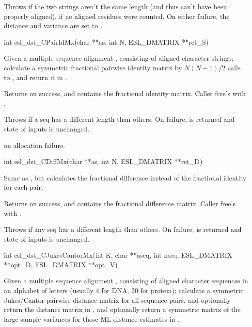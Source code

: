 \begin{sreapi}
Throws  if the two strings aren't the same length (and
thus can't have been properly aligned).
 if no aligned residues were counted.
On either failure, the distance and variance are set
to .


\hypertarget{func:esl_dst_CPairIdMx()}
{\item[int esl\_dst\_CPairIdMx(char **as, int N, ESL\_DMATRIX **ret\_S)]}

Given a multiple sequence alignment , consisting
of  aligned character strings; calculate
a symmetric fractional pairwise identity matrix by $N(N-1)/2$
calls to , and return it in 
.

Returns  on success, and  contains the fractional
identity matrix. Caller free's  with
.

Throws  if a seq has a different
length than others. On failure,  is returned 
and state of inputs is unchanged.

 on allocation failure.


\hypertarget{func:esl_dst_CDiffMx()}
{\item[int esl\_dst\_CDiffMx(char **as, int N, ESL\_DMATRIX **ret\_D)]}

Same as , but calculates
the fractional difference  instead of the
fractional identity  for each pair.

Returns  on success, and  contains the
fractional difference matrix. Caller free's  with 
.

Throws  if any seq has a different
length than others. On failure,  is returned 
and state of inputs is unchanged.


\hypertarget{func:esl_dst_CJukesCantorMx()}
{\item[int esl\_dst\_CJukesCantorMx(int K, char **aseq, int nseq, 
		       ESL\_DMATRIX **opt\_D, ESL\_DMATRIX **opt\_V)]}

Given a multiple sequence alignment , consisting of
 aligned character sequences in an alphabet of
 letters (usually 4 for DNA, 20 for protein);
calculate a symmetric Jukes/Cantor pairwise distance
matrix for all sequence pairs, and optionally return the distance
matrix in , and optionally return a symmetric matrix of the
large-sample variances for those ML distance estimates
in .


\end{sreapi}
